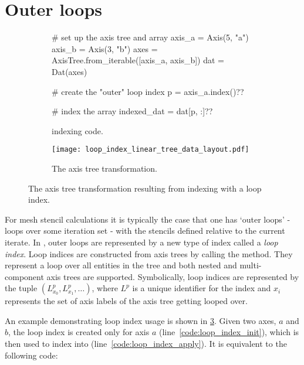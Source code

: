 \documentclass[thesis]{subfiles}
\begin{document}
\section{Outer loops}
\label{sec:outer_loops}

\begin{figure}
  \centering

  \begin{subfigure}{.9\textwidth}
    \begin{pyalg2}
      # set up the axis tree and array
      axis_a = Axis(5, "a")
      axis_b = Axis(3, "b")
      axes = AxisTree.from_iterable([axis_a, axis_b])
      dat = Dat(axes)

      # create the "outer" loop index
      p = axis_a.index()?\label{code:loop_index_init}?

      # index the array
      indexed_dat = dat[p, :]?\label{code:loop_index_apply}?
    \end{pyalg2}

    \caption{ indexing code.}
    \label{fig:loop_index_code}
  \end{subfigure}

  \vspace{1em}

  \begin{subfigure}{\textwidth}
    \centering
    \texttt{[image: loop\_index\_linear\_tree\_data\_layout.pdf]}
    \caption{
      The axis tree transformation.
    }
    \label{fig:loop_index_linear_tree_data_layout}
  \end{subfigure}
  \caption{
    The axis tree transformation resulting from indexing with a loop index.
  }
  \label{fig:loop_index_linear_tree_data_layout_all}
\end{figure}

For mesh stencil calculations it is typically the case that one has `outer loops' - loops over some iteration set - with the stencils defined relative to the current iterate.
In , outer loops are represented by a new type of index called a \emph{loop index}.
Loop indices are constructed from axis trees by calling the  method.
They represent a loop over all entities in the tree and both nested and multi-component axis trees are supported.
Symbolically, loop indices are represented by the tuple $(L^p_{x_0}, L^p_{x_1}, \dots)$, where $L^p$ is a unique identifier for the index and $x_i$ represents the set of axis labels of the axis tree getting looped over.

An example demonstrating loop index usage is shown in \cref{fig:loop_index_linear_tree_data_layout_all}.
Given two axes, $a$ and $b$, the loop index is created only for axis $a$ (line~\ref{code:loop_index_init}), which is then used to index into  (line~\ref{code:loop_index_apply}).
It is equivalent to the following \numpy code:
\end{document}
